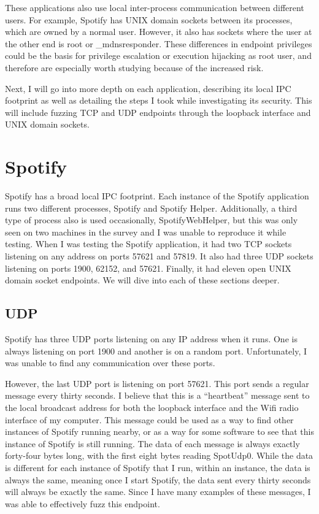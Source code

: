 These applications also use local inter-process communication between different users.  For example, Spotify has UNIX domain sockets between its processes, which are owned by a normal user.  However, it also has sockets where the user at the other end is root or \_mdnsresponder.  These differences in endpoint privileges could be the basis for privilege escalation or execution hijacking as root user, and therefore are especially worth studying because of the increased risk.

Next, I will go into more depth on each application, describing its local IPC footprint as well as detailing the steps I took while investigating its security.  This will include fuzzing TCP and UDP endpoints through the loopback interface and UNIX domain sockets.

\section{Spotify}
\label{sec:spotify}
Spotify has a broad local IPC footprint.  Each instance of the Spotify application runs two different processes, Spotify and Spotify Helper.  Additionally, a third type of process also is used occasionally, SpotifyWebHelper, but this was only seen on two machines in the survey and I was unable to reproduce it while testing.  When I was testing the Spotify application, it had two TCP sockets listening on any address on ports 57621 and 57819.  It also had three UDP sockets listening on ports 1900, 62152, and 57621.  Finally, it had eleven open UNIX domain socket endpoints.  We will dive into each of these sections deeper.

\subsection{UDP}
\label{sec:spotifyUdp}
Spotify has three UDP ports listening on any IP address when it runs.  One is always listening on port 1900 and another is on a random port.  Unfortunately, I was unable to find any communication over these ports.

However, the last UDP port is listening on port 57621.  This port sends a regular message every thirty seconds.  I believe that this is a ``heartbeat'' message sent to the local broadcast address for both the loopback interface and the Wifi radio interface of my computer.  This message could be used as a way to find other instances of Spotify running nearby, or as a way for some software to see that this instance of Spotify is still running.  The data of each message is always exactly forty-four bytes long, with the first eight bytes reading SpotUdp0.  While the data is different for each instance of Spotify that I run, within an instance, the data is always the same, meaning once I start Spotify, the data sent every thirty seconds will always be exactly the same.  Since I have many examples of these messages, I was able to effectively fuzz this endpoint.

